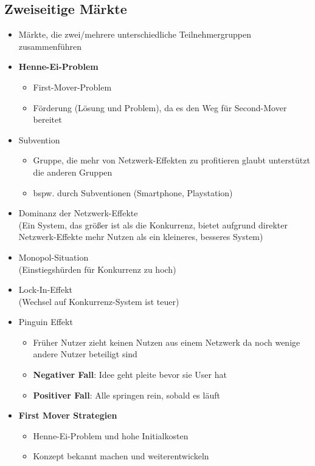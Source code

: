 \documentclass{article} %
\begin{document}
	\subsection{Zweiseitige Märkte}
		\begin{itemize}
			\item Märkte, die zwei/mehrere unterschiedliche Teilnehmergruppen zusammenführen
			\item \glqq \textbf{Henne-Ei-Problem}\grqq
			\begin{itemize}
				\item First-Mover-Problem
				\item Förderung (Lösung und Problem), da es den Weg für Second-Mover bereitet				
			\end{itemize}
			\item Subvention
				\begin{itemize}
					\item Gruppe, die mehr von Netzwerk-Effekten zu profitieren glaubt unterstützt die anderen Gruppen
					\item bspw. durch Subventionen (Smartphone, Playstation)
				\end{itemize}
			\item Dominanz der Netzwerk-Effekte\\
			(Ein System, das größer ist als die Konkurrenz, bietet aufgrund direkter
Netzwerk-Effekte mehr Nutzen als ein kleineres, besseres System)
			\item Monopol-Situation\\
			(Einstiegshürden für Konkurrenz zu hoch)
			\item Lock-In-Effekt\\
			(Wechsel auf Konkurrenz-System ist teuer)
			\item Pinguin Effekt
				\begin{itemize}
					\item Früher Nutzer zieht keinen Nutzen aus einem Netzwerk da noch wenige andere Nutzer beteiligt sind
					\item \textbf{Negativer Fall}: Idee geht pleite bevor sie User hat
					\item \textbf{Positiver Fall}: Alle springen rein, sobald es läuft
				\end{itemize}
			\item \textbf{First Mover Strategien}
				\begin{itemize}
					\item Henne-Ei-Problem und hohe Initialkosten
					\item Konzept bekannt machen und weiterentwickeln

\end{itemize}
\end{itemize}
\end{document}
